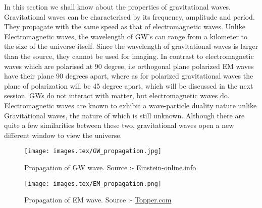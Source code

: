 In this section we shall know about the properties of gravitational waves. Gravitational waves can be characterised by its frequency, amplitude and period. They propagate with the same speed as that of electromagnetic waves. Unlike Electromagnetic waves, the wavelength of GW’s can range from a kilometer to the size of the universe itself. Since the wavelength of gravitational waves is larger than the source, they cannot be used for imaging. In contrast to electromagnetic waves which are polarised at 90 degree, i.e orthogonal plane polarized EM waves have their plane 90 degrees apart, where as for polarized gravitational waves the plane of polarization will be 45 degree apart, which will be discussed in the next session. GWs do not interact with matter, but electromagnetic waves do. Electromagnetic waves are known to exhibit a wave-particle duality nature unlike Gravitational waves, the nature of which is still unknown. Although there are quite a few similarities between these two, gravitational waves open a new different window to view the universe. \cite{Thorne:1995xs}

\begin{figure}[h]
    \centering
    \texttt{[image: images.tex/GW\_propagation.jpg]}
    \caption{Propagation of GW wave. Source :- \href{https://www.einstein-online.info/en/spotlights/gravwav/gravwav-sub01/}{Einstein-online.info}}
\end{figure}

\begin{figure}[h]
    \centering
    \texttt{[image: images.tex/EM\_propagation.png]}
    \caption{Propagation of EM wave. Source :-\; \href{https://www.toppr.com/guides/physics/communication-systems/propagation-of-electromagnetic-waves/}{Topper.com}}
\end{figure}

\pagebreak
